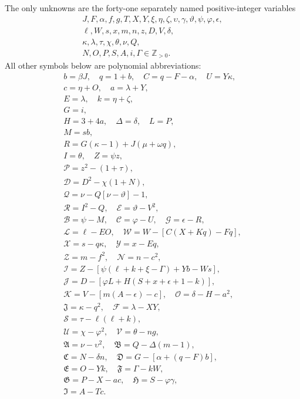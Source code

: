 The only unknowns are the forty-one separately named positive-integer variables
\[
\begin{gathered}J,F,\alpha,f,g,T,X,Y,\xi,\eta,\zeta,\upsilon,\gamma,\vartheta,\psi,\varphi,\epsilon,\\
\ell,W,s,x,m,n,z,D,V,\delta,\\
\kappa,\lambda,\tau,\chi,\theta,\nu,Q,\\
N,O,P,S,A,i,\Gamma\in\mathbb Z_{>0}.\end{gathered}
\]
All other symbols below are polynomial abbreviations:
\[
\begin{gathered}
b=\beta J,\quad q=1+b,\quad C=q-F-\alpha,\quad U=Y\kappa,\\
c=\eta+O,\quad a=\lambda+Y,\\
E=\lambda,\quad k=\eta+\zeta,\\
G=i,\\
H=3+4a,\quad\Delta=\delta,\quad L=P,\\
M=sb,\\
R=G(\kappa-1)+J(\mu+\omega q),\\
I=\theta,\quad Z=\psi z,\\
\mathcal{P}=z^2-(1+\tau),\\
\mathcal{D}=D^2-\chi(1+N),\\
\mathcal{Q}=\nu-Q[\nu-\vartheta]-1,\\
\mathcal{R}=I^2-Q,\quad \mathcal{E}=\vartheta-V^2,\\
\mathcal{B}=\psi-M,\quad \mathcal{C}=\varphi-U,\quad \mathcal{G}=\epsilon-R,\\
\mathcal{L}=\ell-EO,\quad \mathcal{W}=W-[C(X+Kq)-Fq],\\
\mathcal{X}=s-q\kappa,\quad \mathcal{Y}=x-Eq,\\
\mathcal{Z}=m-f^2,\quad \mathcal{N}=n-c^2,\\
\mathcal{I}=Z-[\psi(\ell+k+\xi-\Gamma)+Yb-Ws],\\
\mathcal{J}=D-[\varphi L+H(S+x+\epsilon+1-k)],\\
\mathcal{K}=V-[m(A-\epsilon)-c],\quad\mathcal{O}=\delta-H-a^2,\\
\mathfrak{J}=\kappa-q^2,\quad\mathcal{F}=\lambda-XY,\\
\mathcal{S}=\tau-\ell(\ell+k),\\
\mathcal{U}=\chi-\varphi^2,\quad\mathcal{V}=\theta-ng,\\
\mathfrak{A}=\nu-\upsilon^2,\quad\mathfrak{B}=Q-\Delta(m-1),\\
\mathfrak{C}=N-\delta n,\quad\mathfrak{D}=G-[\alpha+(q-F)b],\\
\mathfrak{E}=O-Yk,\quad\mathfrak{F}=\Gamma-kW,\\
\mathfrak{G}=P-X-ac,\quad\mathfrak{H}=S-\varphi\gamma,\\
\mathfrak{I}=A-Tc.
\end{gathered}
\]
